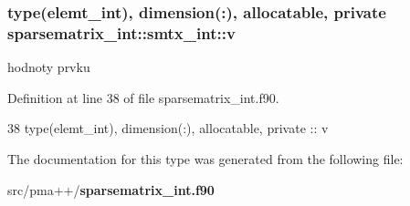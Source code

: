 \subsubsection[{v}]{\setlength{\rightskip}{0pt plus 5cm}type({\bf elemt\+\_\+int}), dimension(\+:), allocatable, private sparsematrix\+\_\+int\+::smtx\+\_\+int\+::v\hspace{0.3cm}{\ttfamily [private]}}\label{structsparsematrix__int_1_1smtx__int_a3b744d5bb0a80b9d0d7982e90ce5f5aa}


hodnoty prvku 



Definition at line 38 of file sparsematrix\+\_\+int.\+f90.


\begin{DoxyCode}
38         \textcolor{keywordtype}{type}(elemt\_int), \textcolor{keywordtype}{dimension(:)}, \textcolor{keywordtype}{allocatable}, \textcolor{keywordtype}{private} :: v
\end{DoxyCode}


The documentation for this type was generated from the following file\+:\begin{DoxyCompactItemize}
\item 
src/pma++/{\bf sparsematrix\+\_\+int.\+f90}\end{DoxyCompactItemize}
